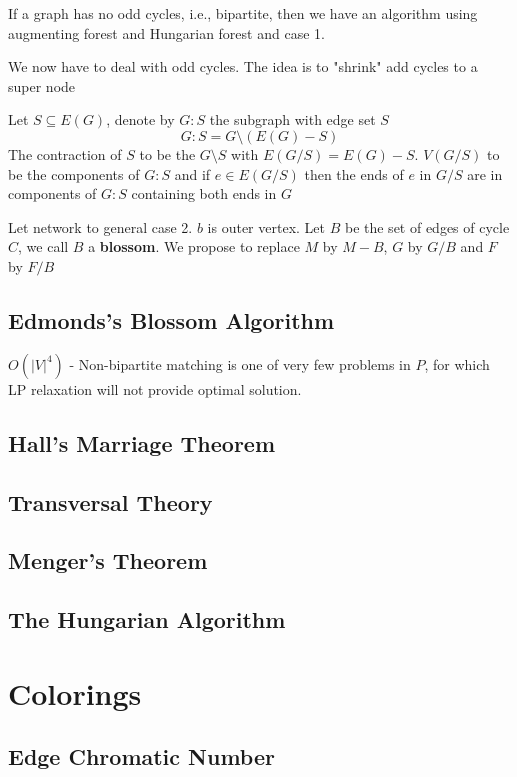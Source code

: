 			If a graph has no odd cycles, i.e., bipartite, then we have an algorithm using augmenting forest and Hungarian forest and case 1.

			We now have to deal with odd cycles. The idea is to "shrink" add cycles to a super node

			Let $S\subseteq E(G)$, denote by $G: S$ the subgraph with edge set $S$
			\begin{equation}
				G:S = G\setminus (E(G)-S)
			\end{equation}
			The contraction of $S$ to be the $G\setminus S$ with $E(G / S) = E(G) - S$. $V(G/S)$ to be the components of $G:S$ and if $e\in E(G/S)$ then the ends of $e$ in $G/S$ are in components of $G:S$ containing both ends in $G$

			Let network to general case 2. $b$ is outer vertex. Let $B$ be the set of edges of cycle $C$, we call $B$ a \textbf{blossom}. We propose to replace $M$ by $M - B$, $G$ by $G/B$ and $F$ by $F/B$

		\section{Edmonds's Blossom Algorithm}

		
			$O(|V|^4)$
			- Non-bipartite matching is one of very few problems in $P$, for which LP relaxation will not provide optimal solution.

		\section{Hall's Marriage Theorem}

		\section{Transversal Theory}

		\section{Menger's Theorem}

		\section{The Hungarian Algorithm}

	\chapter{Colorings}
		\section{Edge Chromatic Number}

